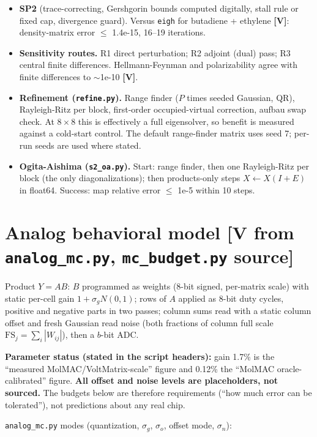 \documentclass[11pt]{article}
\newcommand{\V}{\textbf{[V]}}
\newcommand{\scr}[1]{\texttt{#1}}
\begin{document}
\begin{itemize}
  \item \textbf{SP2} (trace-correcting, Gershgorin bounds computed digitally, stall rule or fixed cap, divergence guard). Versus \scr{eigh} for butadiene + ethylene \V: density-matrix error $\leq$ 1.4e-15, 16--19 iterations.
  \item \textbf{Sensitivity routes.} R1 direct perturbation; R2 adjoint (dual) pass; R3 central finite differences. Hellmann-Feynman and polarizability agree with finite differences to $\sim$1e-10 \V.
  \item \textbf{Refinement (\scr{refine.py}).} Range finder ($P$ times seeded Gaussian, QR), Rayleigh-Ritz per block, first-order occupied-virtual correction, aufbau swap check. At $8 \times 8$ this is effectively a full eigensolver, so benefit is measured against a cold-start control. The default range-finder matrix uses seed 7; per-run seeds are used where stated.
  \item \textbf{Ogita-Aishima (\scr{s2\_oa.py}).} Start: range finder, then one Rayleigh-Ritz per block (the only diagonalizations); then products-only steps $X \leftarrow X(I + E)$ in float64. Success: map relative error $\leq$ 1e-5 within 10 steps.
\end{itemize}

\section{Analog behavioral model [V from \scr{analog\_mc.py}, \scr{mc\_budget.py} source]}

Product $Y = A B$: $B$ programmed as weights (8-bit signed, per-matrix scale) with static per-cell gain $1 + \sigma_g N(0,1)$; rows of $A$ applied as 8-bit duty cycles, positive and negative parts in two passes; column sums read with a static column offset and fresh Gaussian read noise (both fractions of column full scale $\mathrm{FS}_j = \sum_i |W_{ij}|$), then a $b$-bit ADC.

\textbf{Parameter status (stated in the script headers):} gain 1.7\% is the ``measured MolMAC/VoltMatrix-scale'' figure and 0.12\% the ``MolMAC oracle-calibrated'' figure. \textbf{All offset and noise levels are placeholders, not sourced.} The budgets below are therefore requirements (``how much error can be tolerated''), not predictions about any real chip.

\scr{analog\_mc.py} modes (quantization, $\sigma_g$, $\sigma_o$, offset mode, $\sigma_n$):
\end{document}
